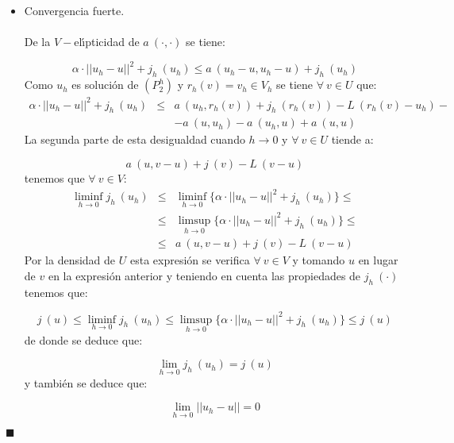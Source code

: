 \begin{demosteorema}
\begin{itemize}
\item Convergencia fuerte.\\ \\
De la $V-$el\'{\i}pticidad de $a\ (\cdot ,\cdot )$ se tiene:

\begin{displaymath}
\alpha \cdot ||u_h-u||^2+j_h\ (u_h)\le a\ (u_h-u,u_h-u)+j_h\ (u_h)
\end{displaymath}
Como $u_h$ es soluci\'on de $(P^h_2)$ y $r_h(v)=v_h\in V_h$ se tiene
$\forall \ v\in U$ que:
\begin{eqnarray*}
\alpha \cdot ||u_h-u||^2 +j_h\ (u_h)&\le &a\ (u_h,r_h(v))+j_h\ (r_h(v))-
L\ (r_h(v)-u_h)-\\
& &-a\ (u,u_h)-a\ (u_h,u)+a\ (u,u)
\end{eqnarray*}
La segunda parte de esta desigualdad cuando $h\to 0$ y $\forall \ v \in U$
tiende a:

\begin{equation} \label{eq:fff}
a\ (u,v-u)+j\ (v)-L\ (v-u)
\end{equation}
tenemos que $\forall \ v \in V$:
\begin{eqnarray*}
\liminf_{h\to 0}j_h\ (u_h)&\le & \liminf_{h\to 0}\{\alpha \cdot ||u_h-u||^2
+j_h\ (u_h)\}\le \\
&\le &\limsup_{h\to 0}\{\alpha \cdot ||u_h-u||^2+j_h\ (u_h)\}\le \\
&\le &a\ (u,v-u)+j\ (v)-L\ (v-u)
\end{eqnarray*}
Por la densidad de $U$ esta expresi\'on se verifica $\forall \ v \in V$ y
tomando $u$ en lugar de $v$ en la expresi\'on anterior y teniendo en cuenta
las propiedades de $j_h\ (\cdot )$ tenemos que:

\begin{displaymath}
j\ (u)\le \liminf_{h\to 0} j_h\ (u_h)\le \limsup_{h\to 0} \{\alpha \cdot
||u_h-u||^2+j_h\ (u_h) \}\le j\ (u)
\end{displaymath}
de donde se deduce que:

\begin{displaymath}
\lim_{h\to 0} j_h\ (u_h) = j\ (u)
\end{displaymath}
y tambi\'en se deduce que:

\begin{displaymath}
\lim_{h\to 0} ||u_h-u||= 0
\end{displaymath}

\end{itemize}

\begin{flushright}
$\blacksquare$
\end{flushright}
\end{demosteorema}
